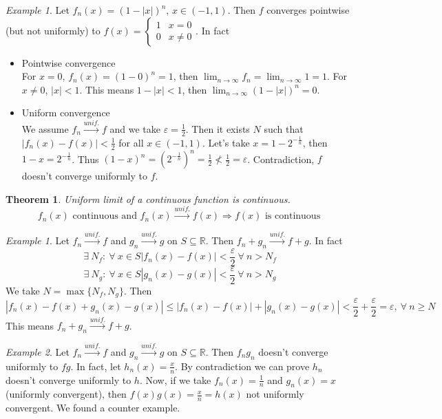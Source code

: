 \documentclass{article}
\newcommand{\DS}{\displaystyle}
\newcommand{\abs}[1]{\left|#1\right|}
\newcommand{\Ar}{\Rightarrow}
\newcommand{\intoo}[1]{\left(#1\right)}
\newcommand{\limn}{\lim_{n \to \infty}}
\newcommand{\tounif}{\xrightarrow{unif.}}
\theoremstyle{definition}
\theoremstyle{definition}
\theoremstyle{plain}
\newtheorem{theorem}{Theorem}[section]
\theoremstyle{plain}
\theoremstyle{plain}
\theoremstyle{plain}
\theoremstyle{definition}
\theoremstyle{remark}
\newtheorem{exampled}{Example}[definition]
\theoremstyle{remark}
\theoremstyle{remark}
\newtheorem{examplet}{Example}[theorem]
\theoremstyle{remark}
\newcommand{\R}{\mathbb{R}}
\newcommand{\ForAll}{\ \forall \ }
\newcommand{\Exists}{\ \exists \ }
\newcommand{\E}{\varepsilon}
\begin{document}
\begin{exampled}
  Let $f_n(x) = (1 - \abs{x})^n$, $x \in \intoo{-1,1}$. Then $f$ converges pointwise (but not uniformly) to $f(x) = \begin{cases}1 & x = 0 \\ 0 & x \neq 0\end{cases}$. In fact
    \begin{itemize}
    \item Pointwise convergence\\
      For $x = 0$, $f_n(x) = (1 - 0)^n = 1$, then $\DS \limn{f_n} = \limn{1} = 1$. For $x \neq 0$, $\abs{x} < 1$. This means $1 - |x| < 1$, then $\DS \limn{(1-|x|)^n} = 0$.
    \item Uniform convergence\\
      We assume $f_n \tounif f$ and we take $\E = \frac{1}{2}$. Then it exists $N$ such that $\abs{f_n(x) - f(x)} < \frac{1}{2}$ for all $x \in \intoo{-1,1}$. Let's take $x = 1 - 2^{-\frac{1}{n}}$, then $1 - x = 2^{-\frac{1}{n}}$. Thus $(1 - x)^n = (2^{-\frac{1}{n}})^n = \frac{1}{2} \nless \frac{1}{2} = \E$. Contradiction, $f$ doesn't converge uniformly to $f$.
    \end{itemize}
\end{exampled}


\begin{theorem}
  Uniform limit of a continuous function is continuous.
  \[
  f_n(x) \text{ continuous and } f_n(x) \tounif f(x) \Ar f(x) \text{ is continuous}
  \]
\end{theorem}


\begin{examplet}
  Let $f_n \tounif f$ and $g_n \tounif g$ on $S \subseteq \R$. Then $f_n + g_n \tounif f + g$. In fact
  \[
  \Exists N_f : \ForAll x \in S \abs{f_n(x) - f(x)} < \frac{\E}{2} \ForAll n > N_f
  \]
  \[
  \Exists N_g : \ForAll x \in S \abs{g_n(x) - g(x)} < \frac{\E}{2} \ForAll n > N_g
  \]
  We take $N = \max \{ N_f, N_g \}$. Then
  \[
  \abs{f_n(x) - f(x) + g_n(x) - g(x)} \leq \abs{f_n(x) - f(x)} + \abs{g_n(x) - g(x)} < \frac{\E}{2} + \frac{\E}{2} = \E, \ForAll n \geq N
  \]
  This means $f_n + g_n \tounif f + g$.
\end{examplet}

\begin{examplet}
  Let $f_n \tounif f$ and $g_n \tounif g$ on $S \subseteq \R$. Then $f_n g_n$ doesn't converge uniformly to $fg$. In fact, let $h_n(x) = \frac{x}{n}$. By contradiction we can prove $h_n$ doesn't converge uniformly to $h$. Now, if we take $f_n(x) = \frac{1}{n}$ and $g_n(x) = x$ (uniformly convergent), then $f(x) g(x) = \frac{x}{n} = h(x)$ not uniformly convergent. We found a counter example.
\end{examplet}
\end{document}
